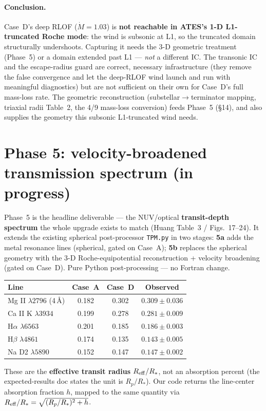 \documentclass[english,a4paper]{kiseon_memo}
\begin{document}
\paragraph{Conclusion.} Case~D's deep RLOF (\(\dot M=1.03\)) is \textbf{not reachable in
ATES's 1-D L1-truncated Roche mode}: the wind is subsonic at L1, so the truncated domain
structurally undershoots. Capturing it needs the 3-D geometric treatment (Phase~5) or a
domain extended past L1 --- \emph{not} a different IC. The transonic IC and the
escape-radius guard are correct, necessary infrastructure (they remove the false
convergence and let the deep-RLOF wind launch and run with meaningful diagnostics) but
are not sufficient on their own for Case~D's full mass-loss rate. The geometric
reconstruction (substellar\(\to\)terminator mapping, triaxial radii Table~2, the 4/9
mass-loss conversion) feeds Phase~5 (\S14), and also supplies the geometry this subsonic
L1-truncated wind needs.

\section{Phase 5: velocity-broadened transmission spectrum (in progress)}
Phase~5 is the headline deliverable --- the NUV/optical \textbf{transit-depth spectrum} the
whole upgrade exists to match (Huang Table~3 / Figs.~17--24). It extends the existing
spherical post-processor \texttt{TPM.py} in two stages: \textbf{5a} adds the metal resonance
lines (spherical, gated on Case~A); \textbf{5b} replaces the spherical geometry with the 3-D
Roche-equipotential reconstruction + velocity broadening (gated on Case~D). Pure Python
post-processing --- no Fortran change.

\begin{center}\small
\begin{tabular}{lccc}
\hline
Line & Case~A & Case~D & Observed \\
\hline
Mg II \(\lambda2796\) (4\,\AA) & 0.182 & 0.302 & \(0.309\pm0.036\) \\
Ca II K \(\lambda3934\) & 0.199 & 0.278 & \(0.281\pm0.009\) \\
H\(\alpha\) \(\lambda6563\) & 0.201 & 0.185 & \(0.186\pm0.003\) \\
H\(\beta\) \(\lambda4861\) & 0.174 & 0.135 & \(0.143\pm0.005\) \\
Na D2 \(\lambda5890\) & 0.152 & 0.147 & \(0.147\pm0.002\) \\
\hline
\end{tabular}
\end{center}
These are the \textbf{effective transit radius \(R_{\rm eff}/R_*\)}, not an absorption percent
(the expected-results doc states the unit is \(R_p/R_*\)). Our code returns the line-center
absorption fraction \(h\), mapped to the same quantity via
\(R_{\rm eff}/R_* = \sqrt{(R_p/R_*)^2 + h}\).
\end{document}
